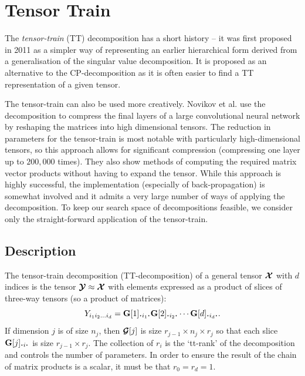 \chapter{Tensor Train}\label{A:tt}

The \emph{tensor-train} (TT) decomposition has a short history -- it was first proposed in
2011 as a simpler way of representing an earlier hierarchical form derived from a
generalisation of the singular value decomposition. \autocite{Osedelets2011} It is proposed
as an alternative to the CP-decomposition as it is often easier to find a TT representation
of a given tensor.

The tensor-train can also be used more creatively. 
Novikov et al. \autocite{Novikov} use the decomposition to compress the final layers of a 
large convolutional neural
network by reshaping the matrices into high dimensional tensors. The reduction in parameters for
the tensor-train is most notable with particularly high-dimensional tensors, so this approach allows
for significant compression (compressing one layer up to \(200,000\) times).
They also show methods of computing the required matrix vector products
without having to expand the tensor. While this approach is highly successful, the implementation
(especially of back-propagation) is somewhat involved and it admits a very large number of ways of
applying the decomposition. To keep our search space of decompositions feasible, we consider only
the straight-forward application of the tensor-train.

\section{Description}
The tensor-train decomposition (TT-decomposition) of a general tensor \(\bm{\mathcal{X}}\) with
\(d\) indices is the tensor \(\bm{\mathcal{Y}} \approx\bm{\mathcal{X}}\) with elements expressed as a
product of slices of three-way tensors (so a product of matrices):
\begin{equation}
			\label{eq:tensortrain_full}
	{Y}_{i_1i_2\dots i_d} 
		= \mat{G}[1]_{\midbullet i_1 \midbullet}\mat{G}[2]_{\midbullet i_2 \midbullet}
			\cdots \mat{G}[d]_{\midbullet i_d \midbullet}.
\end{equation}
If dimension \(j\) is of size \(n_j\), then \(\bm{\mathcal{G}}[j]\) is size 
\(r_{j-1} \times n_j \times r_{j}\) so that each slice \(\mat{G}[j]_{\midbullet i \midbullet}\)
is size \(r_{j-1} \times r_{j}\). The collection of \(r_i\) is the `tt-rank' of the
decomposition and controls the number of parameters. In order to ensure the result of the chain
of matrix products is a scalar, it must be that \(r_0 = r_d = 1\). \autocite{Osedelets2011}

